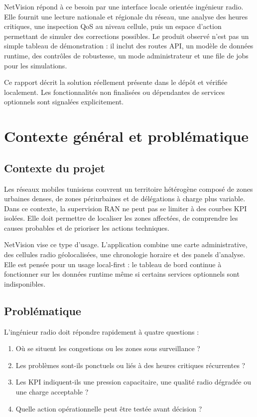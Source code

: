 \documentclass[12pt,a4paper,oneside]{report}
\begin{document}
NetVision répond à ce besoin par une interface locale orientée ingénieur radio. Elle fournit une lecture nationale et régionale du réseau, une analyse des heures critiques, une inspection QoS au niveau cellule, puis un espace d'action permettant de simuler des corrections possibles. Le produit observé n'est pas un simple tableau de démonstration : il inclut des routes API, un modèle de données runtime, des contrôles de robustesse, un mode administrateur et une file de jobs pour les simulations.

Ce rapport décrit la solution réellement présente dans le dépôt et vérifiée localement. Les fonctionnalités non finalisées ou dépendantes de services optionnels sont signalées explicitement.

\chapter{Contexte général et problématique}
\section{Contexte du projet}
Les réseaux mobiles tunisiens couvrent un territoire hétérogène composé de zones urbaines denses, de zones périurbaines et de délégations à charge plus variable. Dans ce contexte, la supervision RAN ne peut pas se limiter à des courbes KPI isolées. Elle doit permettre de localiser les zones affectées, de comprendre les causes probables et de prioriser les actions techniques.

NetVision vise ce type d'usage. L'application combine une carte administrative, des cellules radio géolocalisées, une chronologie horaire et des panels d'analyse. Elle est pensée pour un usage local-first : le tableau de bord continue à fonctionner sur les données runtime même si certains services optionnels sont indisponibles.

\section{Problématique}
L'ingénieur radio doit répondre rapidement à quatre questions :
\begin{enumerate}[label=\arabic*.]
    \item Où se situent les congestions ou les zones sous surveillance ?
    \item Les problèmes sont-ils ponctuels ou liés à des heures critiques récurrentes ?
    \item Les KPI indiquent-ils une pression capacitaire, une qualité radio dégradée ou une charge acceptable ?
    \item Quelle action opérationnelle peut être testée avant décision ?
\end{enumerate}
\end{document}
